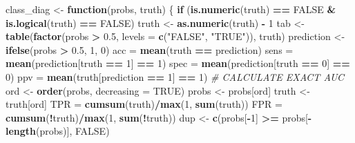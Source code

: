 \documentclass[]{article}
\newenvironment{Shaded}{\begin{snugshade}}{\end{snugshade}}
\newcommand{\KeywordTok}[1]{\textcolor[rgb]{0.13,0.29,0.53}{\textbf{#1}}}
\newcommand{\DataTypeTok}[1]{\textcolor[rgb]{0.13,0.29,0.53}{#1}}
\newcommand{\DecValTok}[1]{\textcolor[rgb]{0.00,0.00,0.81}{#1}}
\newcommand{\FloatTok}[1]{\textcolor[rgb]{0.00,0.00,0.81}{#1}}
\newcommand{\StringTok}[1]{\textcolor[rgb]{0.31,0.60,0.02}{#1}}
\newcommand{\CommentTok}[1]{\textcolor[rgb]{0.56,0.35,0.01}{\textit{#1}}}
\newcommand{\OtherTok}[1]{\textcolor[rgb]{0.56,0.35,0.01}{#1}}
\newcommand{\ControlFlowTok}[1]{\textcolor[rgb]{0.13,0.29,0.53}{\textbf{#1}}}
\newcommand{\OperatorTok}[1]{\textcolor[rgb]{0.81,0.36,0.00}{\textbf{#1}}}
\newcommand{\NormalTok}[1]{#1}
\begin{document}
\begin{Shaded}
\begin{Highlighting}[]
{\NormalTok{class_diag <-}\StringTok{ }\ControlFlowTok{function}\NormalTok{(probs, truth) \{}
    \ControlFlowTok{if}\NormalTok{ (}\KeywordTok{is.numeric}\NormalTok{(truth) }\OperatorTok{==}\StringTok{ }\OtherTok{FALSE} \OperatorTok{&}\StringTok{ }\KeywordTok{is.logical}\NormalTok{(truth) }\OperatorTok{==}\StringTok{ }\OtherTok{FALSE}\NormalTok{) }
\NormalTok{        truth <-}\StringTok{ }\KeywordTok{as.numeric}\NormalTok{(truth) }\OperatorTok{-}\StringTok{ }\DecValTok{1}
\NormalTok{    tab <-}\StringTok{ }\KeywordTok{table}\NormalTok{(}\KeywordTok{factor}\NormalTok{(probs }\OperatorTok{>}\StringTok{ }\FloatTok{0.5}\NormalTok{, }\DataTypeTok{levels =} \KeywordTok{c}\NormalTok{(}\StringTok{"FALSE"}\NormalTok{, }\StringTok{"TRUE"}\NormalTok{)), }
\NormalTok{        truth)}
\NormalTok{    prediction <-}\StringTok{ }\KeywordTok{ifelse}\NormalTok{(probs }\OperatorTok{>}\StringTok{ }\FloatTok{0.5}\NormalTok{, }\DecValTok{1}\NormalTok{, }\DecValTok{0}\NormalTok{)}
\NormalTok{    acc =}\StringTok{ }\KeywordTok{mean}\NormalTok{(truth }\OperatorTok{==}\StringTok{ }\NormalTok{prediction)}
\NormalTok{    sens =}\StringTok{ }\KeywordTok{mean}\NormalTok{(prediction[truth }\OperatorTok{==}\StringTok{ }\DecValTok{1}\NormalTok{] }\OperatorTok{==}\StringTok{ }\DecValTok{1}\NormalTok{)}
\NormalTok{    spec =}\StringTok{ }\KeywordTok{mean}\NormalTok{(prediction[truth }\OperatorTok{==}\StringTok{ }\DecValTok{0}\NormalTok{] }\OperatorTok{==}\StringTok{ }\DecValTok{0}\NormalTok{)}
\NormalTok{    ppv =}\StringTok{ }\KeywordTok{mean}\NormalTok{(truth[prediction }\OperatorTok{==}\StringTok{ }\DecValTok{1}\NormalTok{] }\OperatorTok{==}\StringTok{ }\DecValTok{1}\NormalTok{)}
    \CommentTok{# CALCULATE EXACT AUC}
\NormalTok{    ord <-}\StringTok{ }\KeywordTok{order}\NormalTok{(probs, }\DataTypeTok{decreasing =} \OtherTok{TRUE}\NormalTok{)}
\NormalTok{    probs <-}\StringTok{ }\NormalTok{probs[ord]}
\NormalTok{    truth <-}\StringTok{ }\NormalTok{truth[ord]}
\NormalTok{    TPR =}\StringTok{ }\KeywordTok{cumsum}\NormalTok{(truth)}\OperatorTok{/}\KeywordTok{max}\NormalTok{(}\DecValTok{1}\NormalTok{, }\KeywordTok{sum}\NormalTok{(truth))}
\NormalTok{    FPR =}\StringTok{ }\KeywordTok{cumsum}\NormalTok{(}\OperatorTok{!}\NormalTok{truth)}\OperatorTok{/}\KeywordTok{max}\NormalTok{(}\DecValTok{1}\NormalTok{, }\KeywordTok{sum}\NormalTok{(}\OperatorTok{!}\NormalTok{truth))}
\NormalTok{    dup <-}\StringTok{ }\KeywordTok{c}\NormalTok{(probs[}\OperatorTok{-}\DecValTok{1}\NormalTok{] }\OperatorTok{>=}\StringTok{ }\NormalTok{probs[}\OperatorTok{-}\KeywordTok{length}\NormalTok{(probs)], }\OtherTok{FALSE}\NormalTok{)}
}
\end{Highlighting}
\end{Shaded}
\end{document}
